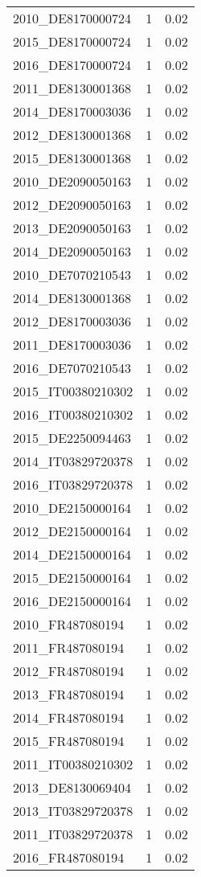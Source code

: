 \begin{table*}[htbp]
\begin{tabular}{lrr}
2010_DE8170000724 & 1 & 0.02 \\
2015_DE8170000724 & 1 & 0.02 \\
2016_DE8170000724 & 1 & 0.02 \\
2011_DE8130001368 & 1 & 0.02 \\
2014_DE8170003036 & 1 & 0.02 \\
2012_DE8130001368 & 1 & 0.02 \\
2015_DE8130001368 & 1 & 0.02 \\
2010_DE2090050163 & 1 & 0.02 \\
2012_DE2090050163 & 1 & 0.02 \\
2013_DE2090050163 & 1 & 0.02 \\
2014_DE2090050163 & 1 & 0.02 \\
2010_DE7070210543 & 1 & 0.02 \\
2014_DE8130001368 & 1 & 0.02 \\
2012_DE8170003036 & 1 & 0.02 \\
2011_DE8170003036 & 1 & 0.02 \\
2016_DE7070210543 & 1 & 0.02 \\
2015_IT00380210302 & 1 & 0.02 \\
2016_IT00380210302 & 1 & 0.02 \\
2015_DE2250094463 & 1 & 0.02 \\
2014_IT03829720378 & 1 & 0.02 \\
2016_IT03829720378 & 1 & 0.02 \\
2010_DE2150000164 & 1 & 0.02 \\
2012_DE2150000164 & 1 & 0.02 \\
2014_DE2150000164 & 1 & 0.02 \\
2015_DE2150000164 & 1 & 0.02 \\
2016_DE2150000164 & 1 & 0.02 \\
2010_FR487080194 & 1 & 0.02 \\
2011_FR487080194 & 1 & 0.02 \\
2012_FR487080194 & 1 & 0.02 \\
2013_FR487080194 & 1 & 0.02 \\
2014_FR487080194 & 1 & 0.02 \\
2015_FR487080194 & 1 & 0.02 \\
2011_IT00380210302 & 1 & 0.02 \\
2013_DE8130069404 & 1 & 0.02 \\
2013_IT03829720378 & 1 & 0.02 \\
2011_IT03829720378 & 1 & 0.02 \\
2016_FR487080194 & 1 & 0.02 \\

\end{tabular}
\end{table*}
